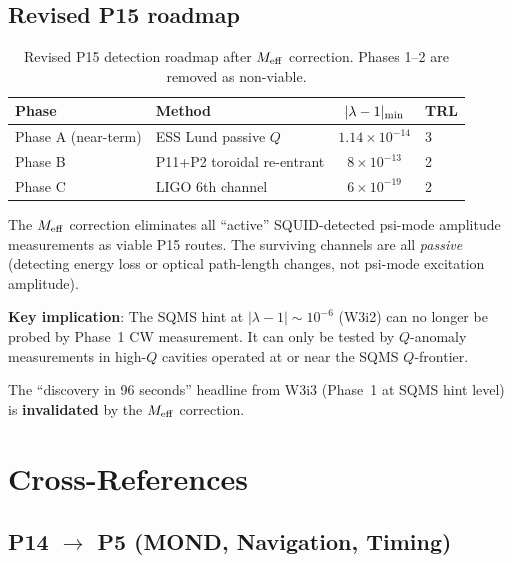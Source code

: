\documentclass[11pt]{article}
\newcommand{\ee}[1]{\times 10^{#1}}
\newcommand{\lam}{\lambda}
\begin{document}
\subsection{Revised P15 roadmap}

\begin{table}[H]
\centering
\caption{Revised P15 detection roadmap after $M_{\rm eff}$ correction.
Phases 1--2 are removed as non-viable.}
\label{tab:P15-revised}
\begin{tabular}{llcl}
\toprule
\textbf{Phase} & \textbf{Method} & $|\lam-1|_{\rm min}$ & \textbf{TRL} \\
\midrule
Phase A (near-term) & ESS Lund passive $Q$ & $1.14\ee{-14}$ & 3 \\
Phase B & P11+P2 toroidal re-entrant & $8\ee{-13}$ & 2 \\
Phase C & LIGO 6th channel & $6\ee{-19}$ & 2 \\
\bottomrule
\end{tabular}
\end{table}

\begin{tcolorbox}[colback=yellow!5!white, colframe=orange!60!black,
  title=\textbf{Revised P15 Strategy: Passive Detection Is the Only Near-Term Path}]
The $M_{\rm eff}$ correction eliminates all ``active'' SQUID-detected
psi-mode amplitude measurements as viable P15 routes. The surviving
channels are all \emph{passive} (detecting energy loss or optical
path-length changes, not psi-mode excitation amplitude).

\textbf{Key implication}: The SQMS hint at $|\lam-1| \sim 10^{-6}$
(W3i2) can no longer be probed by Phase~1 CW measurement. It can
only be tested by $Q$-anomaly measurements in high-$Q$ cavities
operated at or near the SQMS $Q$-frontier.

The ``discovery in 96 seconds'' headline from W3i3 (Phase~1 at SQMS
hint level) is \textbf{invalidated} by the $M_{\rm eff}$ correction.
\end{tcolorbox}

\section{Cross-References}
\label{sec:xrefs}

\subsection{P14 $\to$ P5 (MOND, Navigation, Timing)}
\end{document}
